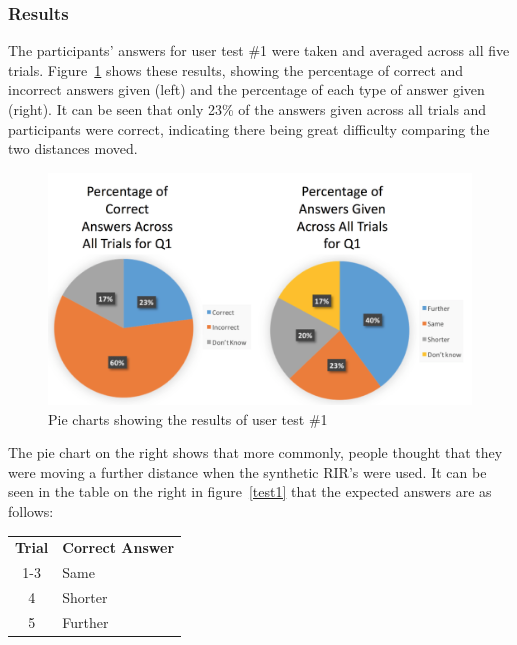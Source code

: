 \documentclass[../../main.tex]{subfiles}
\begin{document}
		\subsubsection{Results}
			The participants' answers for user test \#1 were taken and averaged across all five trials. Figure~\ref{test1Results} shows these results, showing the percentage of correct and incorrect answers given (left) and the percentage of each type of answer given (right). It can be seen that only 23\% of the answers given across all trials and participants were correct, indicating there being great difficulty comparing the two distances moved.

			\begin{figure}[t]
				\centerline{\includegraphics[width=\textwidth]{Sections/userTesting/images/test1/Q1Pies.png}}
				\caption{Pie charts showing the results of user test \#1}
				\label{test1Results}
			\end{figure}	
			
			The pie chart on the right shows that more commonly, people thought that they were moving a further distance when the synthetic \ac{RIR}'s were used. It can be seen in the table on the right in figure~\ref{test1} that the expected answers are as follows:

			\begin{center}
			\begin{tabular}{c l}
			\textbf{Trial} & \textbf{Correct Answer} \\
			1-3 & Same \\
			4 & Shorter \\
			5 & Further
			\end{tabular}
			\end{center}
\end{document}
